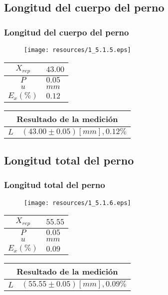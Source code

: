 \documentclass[letter,11pt]{beamer}
\begin{document}
\subsection{Longitud del cuerpo del perno}
\begin{frame}
\frametitle{Longitud del cuerpo del perno}
\vspace*{0.8cm}
\begin{figure}
\centering
\texttt{[image: resources/1\_5.1.5.eps]}
\end{figure}
\vspace*{0.4cm}
\scriptsize
\begin{tabular}{|c|>{\centering}m{1.8cm}<{\centering}|}
\hline
$X_{rep}$ &  $43.00$ \tabularnewline \hline
      $P$ &   $0.05$ \tabularnewline \hline
      $u$ &     $mm$ \tabularnewline \hline
$E_x(\%)$ &   $0.12$ \tabularnewline \hline
\end{tabular}
\quad
\begin{tabular}{|c|>{\centering}m{5.7cm}<{\centering}|}
\hline
\multicolumn{2}{|c|}{\textbf{Resultado de la medición}} \\ \hline
$L$ & $( 43.00\pm0.05)[mm], 0.12\%$ \tabularnewline \hline
\end{tabular}
\end{frame}

\subsection{Longitud total del perno}
\begin{frame}
\frametitle{Longitud total del perno}
\vspace*{0.8cm}
\begin{figure}
\centering
\texttt{[image: resources/1\_5.1.6.eps]}
\end{figure}
\vspace*{0.4cm}
\scriptsize
\begin{tabular}{|c|>{\centering}m{1.8cm}<{\centering}|}
\hline
$X_{rep}$ &  $55.55$ \tabularnewline \hline
      $P$ &   $0.05$ \tabularnewline \hline
      $u$ &     $mm$ \tabularnewline \hline
$E_x(\%)$ &   $0.09$ \tabularnewline \hline
\end{tabular}
\quad
\begin{tabular}{|c|>{\centering}m{5.7cm}<{\centering}|}
\hline
\multicolumn{2}{|c|}{\textbf{Resultado de la medición}} \\ \hline
$L$ & $( 55.55\pm0.05)[mm], 0.09\%$ \tabularnewline \hline
\end{tabular}
\end{frame}
\end{document}
